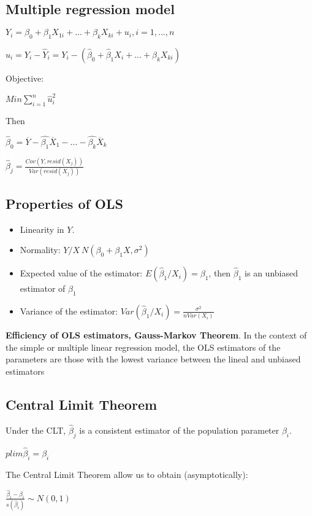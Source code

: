 \documentclass[10pt,landscape]{article}
\begin{document}
\begin{multicols}{3}
\subsection*{Multiple regression model}

$Y_i = \beta_0 + \beta_1 X_{1i} + ... + \beta_k X_{ki} + u_i, i = 1,..., n$

$\hat{u}_i = Y_i - \hat{Y}_i = Y_i - (\hat{\beta}_0 + \hat{\beta}_1 X_i + ... + \hat{\beta}_k X_{ki})$

Objective:

$Min \sum_{i=1}^n \hat{u}_i^2$

Then

$\hat{\beta}_0 = \overline{Y} - \hat{\beta_1} \overline{X}_1 - ... - \hat{\beta_k} \overline{X}_k$

$\hat{\beta}_j = \frac{Cov(Y, resid(X_j))}{Var(resid(X_j))}$

\subsection*{Properties of OLS}

\begin{itemize}
\item Linearity in $Y$.
\item Normality: $Y / X ~ N(\beta_0 + \beta_1 X, \sigma^2)$
\item Expected value of the estimator: $E(\hat{\beta}_1 / X_i) = \beta_1$, then $\hat{\beta}_1$ is an unbiased estimator of $\beta_1$
\item Variance of the estimator: $Var(\hat{\beta}_1 / X_i) = \frac{\sigma^2}{n Var(X_i)}$
\end{itemize}

\textbf{Efficiency of OLS estimators, Gauss-Markov Theorem}. In the context of the simple or multiple linear regression model, the OLS estimators of the parameters are those with the lowest variance between the lineal and unbiased estimators

\subsection*{Central Limit Theorem}
Under the CLT, $\hat{\beta}_j$ is a consistent estimator of the population parameter $\beta_i$.

$p lim \hat{\beta}_i = \beta_i$

The Central Limit Theorem allow us to obtain (asymptotically):

$\frac{\hat{\beta}_i - \beta_i}{s(\hat{\beta}_i)} \sim N(0,1)$


\end{multicols}
\end{document}
